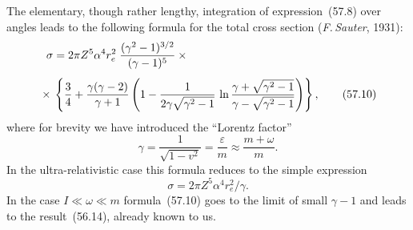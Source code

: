 The elementary, though rather lengthy, integration of expression~(57.8) over angles leads to the following formula for the total cross section (\textit{F.\,Sauter}, 1931):
\begin{align}
\sigma &= 2\pi Z^5\alpha^4 r^2_e\;\frac{(\gamma^2-1)^{3/2}}{(\gamma-1)^5}\times{}\notag\\[4pt]
{}\times{}&\left\{\frac{3}{4} + \frac{\gamma(\gamma-2)}{\gamma+1}\left(1 - \frac{1}{2\gamma\sqrt{\gamma^2-1}}\,\ln\frac{\gamma+\sqrt{\gamma^2-1}}{\gamma-\sqrt{\gamma^2-1}}\right)\right\},
\tag{57.10}
\end{align}
where for brevity we have introduced the ``Lorentz factor''
\begin{equation}
\gamma = \frac{1}{\sqrt{1-v^2}} = \frac{\varepsilon}{m} \approx \frac{m+\omega}{m}.
\tag{57.11}
\end{equation}
In the ultra-relativistic case this formula reduces to the simple expression
\begin{equation}
\sigma = 2\pi Z^5\alpha^4 r^2_e/\gamma.
\tag{57.12}
\end{equation}
In the case $I \ll \omega \ll m$ formula~(57.10) goes to the limit of small $\gamma - 1$ and leads to the result~(56.14), already known to us.
